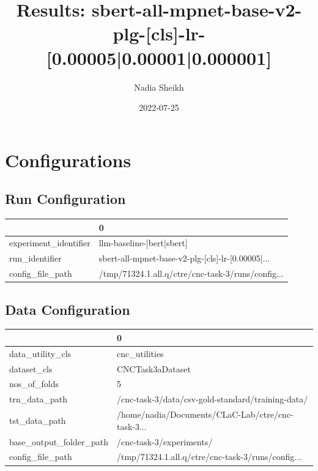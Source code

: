\documentclass{article}
\title{Results: sbert-all-mpnet-base-v2-plg-[cls]-lr-[0.00005|0.00001|0.000001]}
\author{Nadia Sheikh}
\date{2022-07-25}
\begin{document}
\maketitle
\section{Configurations}
\subsection{Run Configuration}
\begin{tabular}{ll}
\toprule
{} &                                                  0 \\
\midrule
experiment\_identifier &                          llm-baseline-[bert|sbert] \\
run\_identifier        &  sbert-all-mpnet-base-v2-plg-[cls]-lr-[0.00005|... \\
config\_file\_path      &  /tmp/71324.1.all.q/ctre/cnc-task-3/runs/config... \\
\bottomrule
\end{tabular}

\subsection{Data Configuration}
\begin{tabular}{ll}
\toprule
{} &                                                  0 \\
\midrule
data\_utility\_cls        &                                      cnc\_utilities \\
dataset\_cls             &                                   CNCTask3aDataset \\
nos\_of\_folds            &                                                  5 \\
trn\_data\_path           &  /cnc-task-3/data/csv-gold-standard/training-data/ \\
tst\_data\_path           &  /home/nadia/Documents/CLaC-Lab/ctre/cnc-task-3... \\
base\_output\_folder\_path &                           /cnc-task-3/experiments/ \\
config\_file\_path        &  /tmp/71324.1.all.q/ctre/cnc-task-3/runs/config... \\
\bottomrule
\end{tabular}
\end{document}
